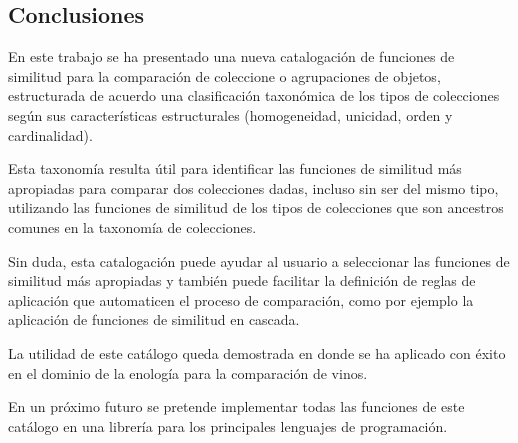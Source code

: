 \documentclass[a4paper,10pt,twoside]{article}
\theoremstyle{definition}
\begin{document}

\subsection{Conclusiones}
En este trabajo se ha presentado una nueva catalogación de funciones de similitud para la comparación de coleccione o agrupaciones de objetos, estructurada de acuerdo una clasificación taxonómica de los tipos de colecciones según sus características estructurales (homogeneidad, unicidad, orden y cardinalidad).

Esta taxonomía resulta útil para identificar las funciones de similitud más apropiadas para comparar dos colecciones dadas, incluso sin ser del mismo tipo, utilizando las funciones de similitud de los tipos de colecciones que son ancestros comunes en la taxonomía de colecciones.

Sin duda, esta catalogación puede ayudar al usuario a seleccionar las funciones de similitud más apropiadas y también puede facilitar la definición de reglas de aplicación que automaticen el proceso de comparación, como por ejemplo la aplicación de funciones de similitud en cascada.

La utilidad de este catálogo queda demostrada en \cite{sanchezalberca2015modelado} donde se ha aplicado con éxito en el dominio de la enología para la comparación de vinos.

En un próximo futuro se pretende implementar todas las funciones de este catálogo en una librería para los principales lenguajes de programación. 
\end{document}
